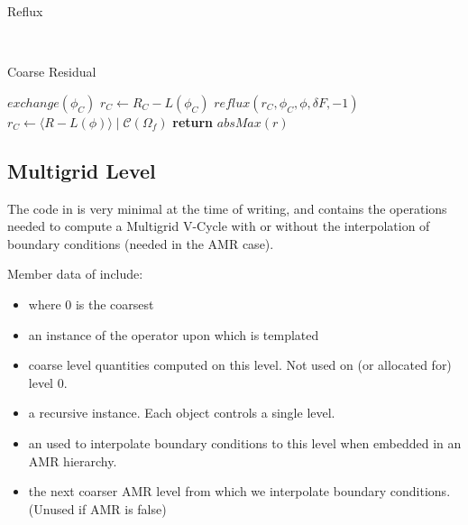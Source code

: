 \documentclass[12pt,a4paper]{article}
\begin{document}
\begin{algorithm}
\caption{Reflux}
\begin{algorithmic}[1]
 
 \\
\EndProcedure
\end{algorithmic}
\end{algorithm}

\begin{algorithm}
\caption{Coarse Residual}
\begin{algorithmic}[1]
\State $exchange(\phi_C)$
\State $r_C \gets R_C - L(\phi_C)$
\State $reflux(r_C, \phi_C, \phi, \delta F,-1)$
\State $r_C \gets \langle R - L(\phi)\rangle\mid \mathcal{C}(\Omega_f)$
\State \textbf{return} $absMax(r)$
\EndProcedure
\end{algorithmic}
\end{algorithm}

\pagebreak
\subsection{Multigrid Level}

The code in  is very minimal at the time of writing, and contains the operations needed to compute a Multigrid V-Cycle with or without the interpolation of boundary conditions (needed in the AMR case). 

Member data of  include:
\begin{itemize}
\item {} where 0 is the coarsest 
\item {} an instance of the operator upon which  is templated
\item {} coarse level quantities computed on this level. Not used on (or allocated for) level 0. 
\item {} a recursive  instance. Each  object controls a single level.
\item {} an  used to interpolate boundary conditions to this level when embedded in an AMR hierarchy. 
\item {} the next coarser AMR level from which we interpolate boundary conditions. (Unused if AMR is false)
\end{itemize}
\end{document}
